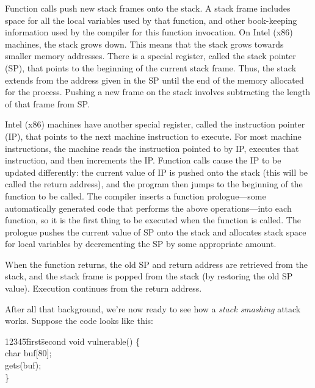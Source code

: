 \documentclass[11pt]{article}
\begin{document}
Function calls push new
stack frames onto the stack. A stack frame includes space for all the
local variables used by that function, and other book-keeping
information used by the compiler for this function invocation. On
Intel (x86) machines, the stack grows down. This means that the stack
grows towards smaller memory addresses. There is a special register,
called the stack pointer (SP), that points to the beginning of the
current stack frame. Thus, the stack extends from the address given in
the SP until the end of the memory allocated for the process.
Pushing a new frame on the stack involves subtracting the length of that frame from SP.  

Intel (x86)
machines have another special register, called the instruction pointer
(IP), that points to the next machine instruction to execute. For most
machine instructions, the machine reads the instruction pointed to by
IP, executes that instruction, and then increments the IP. Function
calls cause the IP to be updated differently: the current value of IP
is pushed onto the stack (this will be called the return address), and
the program then jumps to the beginning of the function to be
called. The compiler inserts a function prologue---some automatically
generated code that performs the above operations---into each function,
so it is the first thing to be executed when the function is
called. The prologue pushes the current value of SP onto the stack and
allocates stack space for local variables by decrementing the SP by
some appropriate amount.  

When the function returns, the old SP and
return address are retrieved from the stack, and the stack frame is
popped from the stack (by restoring the old SP value). Execution
continues from the return address.  

After all that background, we're now ready to see how a 
\textit{stack smashing} attack works. Suppose the code looks like this:

\begin{ttfamily}
\begin{tabbing}
12345\=first\=second \kill
void vulnerable() \{ \\
\>char buf[80]; \\
\>gets(buf); \\
\} \\
\end{tabbing}
\end{ttfamily}
\end{document}
